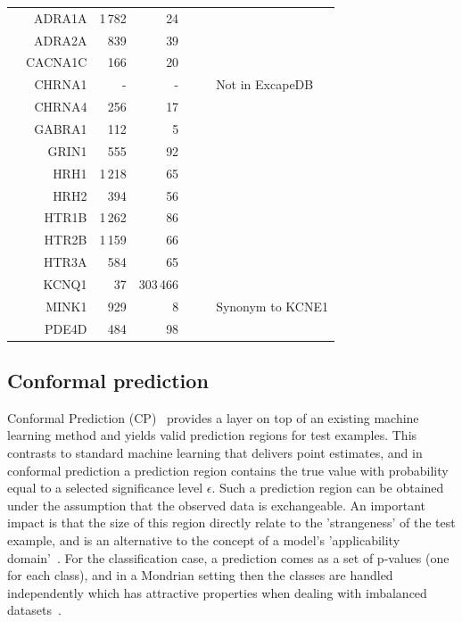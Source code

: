 \documentclass[10pt,article]{memoir}
\newenvironment{wideMinipage}
{ \vskip 1\baselineskip
  \noindent   
  \checkoddpage%
  \ifoddpage%
     \hspace*{-3em}%
  \else%
     \hspace*{-3em}%
  \fi%
  \begin{minipage}{1\textwidth + 6em}
}
{ 
    \end{minipage}
    \vskip 1\baselineskip
}
\begin{document}
\begin{table}[p]
\begin{wideMinipage}
\begin{tabular}{crrrrcl}
&    ADRA1A  &       1\,782  &       24          &            &       &       \\
&    ADRA2A  &       839     &       39          &            &       &       \\
&    CACNA1C &       166     &       20          &            &       &       \\
&    CHRNA1  &       -       &       -           &            &       & Not in ExcapeDB \\
&    CHRNA4  &       256     &       17          &            &       &       \\
&    GABRA1  &       112     &       5           &            &       &       \\
&    GRIN1   &       555     &       92          &            &       &       \\
&    HRH1    &       1\,218  &       65          &            &       &       \\
&    HRH2    &       394     &       56          &            &       &       \\
&    HTR1B   &       1\,262  &       86          &            &       &       \\
&    HTR2B   &       1\,159  &       66          &            &       &       \\
&    HTR3A   &       584     &       65          &            &       &       \\
&    KCNQ1   &       37      &       303\,466    &            &       &       \\
&    MINK1   &       929     &       8           &            &       & Synonym to KCNE1 \\
&    PDE4D   &       484     &       98          &            &       &       \\

\bottomrule
\end{tabular}
\end{wideMinipage}
\end{table}

\subsection{Conformal prediction}
Conformal Prediction (CP)~\cite{Vovk2005} provides a layer on top of an
existing machine learning method and yields valid prediction regions for test
examples. This contrasts to standard machine learning that delivers point
estimates, and in conformal prediction a prediction region contains the true
value with probability equal to a selected significance level $\epsilon$. Such
a prediction region can be obtained under the assumption that the observed data
is exchangeable. An important impact is that the size of this region directly
relate to the 'strangeness' of the test example, and is an alternative to the
concept of a model's 'applicability domain'~\cite{norinder2014introducing}. For
the classification case, a prediction comes as a set of p-values (one for each
class), and in a Mondrian setting then the classes are handled independently
which has attractive properties when dealing with imbalanced
datasets~\cite{Norinder:2017qc,Sun:2017qm}. 
\end{document}
